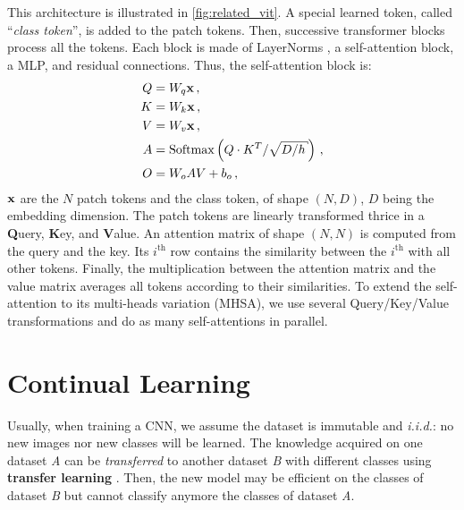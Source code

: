 This architecture is illustrated in \autoref{fig:related_vit}. A special learned token, called
``\textit{class token}'', is added to the patch tokens. Then, successive transformer blocks process
all the tokens. Each block is made of LayerNorms \citep{ba2016layernorm}, a self-attention block, a
\ac{MLP}, and residual connections. Thus, the self-attention block is:
%
\begin{equation}
      \begin{aligned}
            Q & =W_{q} \vx\,,                                                       \\
            K & =W_{k} \vx\,,                                                       \\
            V & =W_{v} \vx\,,                                                       \\
            A & =\operatorname{Softmax}\left(Q \cdot K^{T} / \sqrt{D / h}\right)\,, \\
            O & = W_{o} A V+b_{o}\,,
      \end{aligned}
      \label{sec:related_sa}
\end{equation}
%
\noindent $\mathbf{x}$ are the $N$ patch tokens and the class token, of shape $(N, D)$, $D$ being the
embedding dimension. The patch tokens are linearly transformed thrice in a \textbf{Q}uery,
\textbf{K}ey, and \textbf{V}alue. An attention matrix of shape $(N, N)$ is computed from the query
and the key. Its $i^{\text{th}}$ row contains the similarity between the $i^{\text{th}}$ with all
other tokens. Finally, the multiplication between the attention matrix and the value matrix averages
all tokens according to their similarities. To extend the self-attention to its multi-heads
variation (\ac{MHSA}), we use several Query/Key/Value transformations and do as many self-attentions
in parallel.

\section{Continual Learning}
\label{sec:related_continual}

Usually, when training a \ac{CNN}, we assume the dataset is immutable and \textit{i.i.d.}: no new
images nor new classes will be learned. The knowledge acquired on one dataset \textit{A} can be
\textit{transferred} to another dataset \textit{B} with different classes using \textbf{transfer learning}
\citep{razavian2014transferlearning}. Then, the new model may be efficient on
the classes of dataset \textit{B} but cannot classify anymore the classes of dataset \textit{A}.

